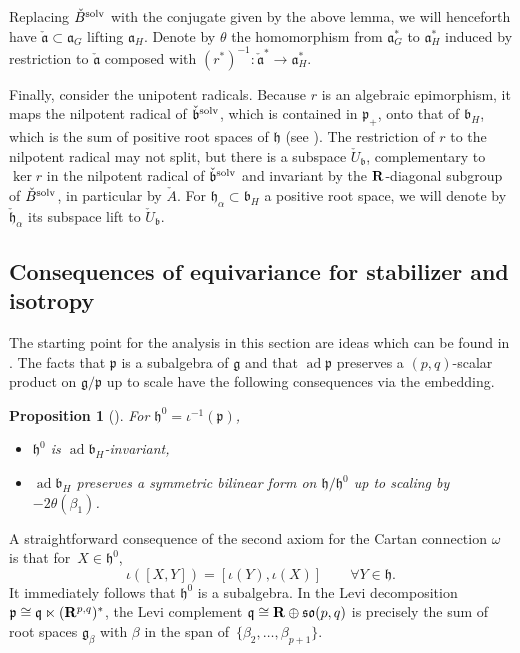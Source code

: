 \documentclass[10pt,a4paper]{amsart}
\numberwithin{equation}{section}
\newtheorem{prop}[thm]{Proposition}
\theoremstyle{definition}
\newcommand{\BR}{{\bf R}}
\newcommand{\lieg}{\mathfrak{g}}
\newcommand{\lieh}{\mathfrak{h}}
\def\p{{\mathfrak p}}
\def\q{{\mathfrak q}}
\def\a{{\mathfrak a}}
\def\b{{\mathfrak b}}
\newcommand{\so}{\mathfrak{so}}
\newcommand{\ad}{\operatorname{ad}}
\begin{document}
 Replacing $\check{B}^{\rm solv}$ with the conjugate given by the above lemma, we will henceforth have $\check{\a} \subset \a_G$ lifting $\a_H$. Denote by $\theta$ the homomorphism from $\a_G^*$ to $\a_H^*$ induced by restriction to $\check{\a}$ composed with $(r^*)^{-1}\colon \check{\a}^* \rightarrow \a_H^*$.


Finally, consider the unipotent radicals.
Because $r$ is an algebraic epimorphism, it maps the nilpotent radical of $\check{\b}^{\rm solv}$, which is contained in $\p_+$, onto that of $\b_H$, which is the sum of positive root spaces of $\lieh$ (see \cite[Corollary 4.3.6]{morris.ratners.thms.book}). The restriction of $r$ to the nilpotent radical may not split,
but there is a subspace $\check{U}_{\b}$,
complementary to $\ker r$ in the nilpotent radical of $\check{\b}^{\rm solv}$ and invariant by the $\BR$-diagonal subgroup of $\check{B}^{\rm solv}$, in particular by $\check{A}$. For $\lieh_\alpha \subset \b_H$ a positive root space, we will denote by $\check{\lieh}_\alpha$ its subspace lift to $\check{U}_\b$.


\subsection{Consequences of equivariance for stabilizer and isotropy}
\label{subsec.consequences.stab.iso}

The starting point for the analysis in this section are ideas which can be found in \cite{pecastaing.rank1}.
The facts that $\p$ is a subalgebra of $\lieg$ and that $\ad \p$ preserves a $(p,q)$-scalar product on $\lieg/\p$ up to scale have the following consequences via the embedding.

\begin{prop}[{\cite[Proposition~2.1]{pecastaing.rank1}}]\label{prop.vincent}
For $\lieh^0 = \iota^{-1}(\p)$,
\begin{itemize}\itemsep=0pt
\item[$(1)$] $\lieh^0$ is $\ad \b_H$-invariant,
\item[$(2)$] $\ad \b_H$ preserves a symmetric bilinear form on $\lieh/\lieh^0$ up to scaling by $- 2 \theta(\beta_1)$.
\end{itemize}
\end{prop}


A straightforward consequence of the second axiom for the Cartan connection $\omega$ is that for~${X \in \lieh^0}$,
\begin{equation}
\label{eqn.iota.in.p}
 \iota ( [X,Y] ) = [\iota(Y),\iota(X)] \qquad \forall Y \in \lieh.
 \end{equation}
 It immediately follows that $\lieh^0$ is a subalgebra. In the Levi decomposition $\p \cong \q \ltimes (\BR^{p,q})^*$, the Levi complement $\q \cong \BR \oplus \so(p,q)$ is precisely the sum of root spaces $\lieg_\beta$ with $\beta$ in the span of~$\{ \beta_2, \dots, \beta_{p+1} \}$.
\end{document}
